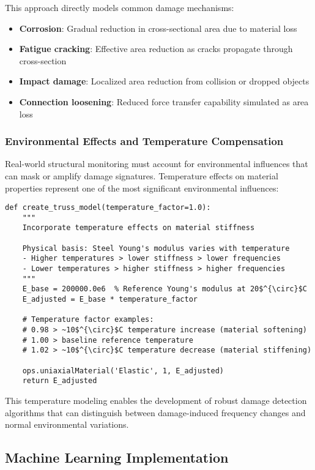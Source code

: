 \documentclass[11pt,a4paper]{article}
\begin{document}
This approach directly models common damage mechanisms:
\begin{itemize}
    \item \textbf{Corrosion}: Gradual reduction in cross-sectional area due to material loss
    \item \textbf{Fatigue cracking}: Effective area reduction as cracks propagate through cross-section
    \item \textbf{Impact damage}: Localized area reduction from collision or dropped objects
    \item \textbf{Connection loosening}: Reduced force transfer capability simulated as area loss
\end{itemize}

\subsubsection{Environmental Effects and Temperature Compensation}

Real-world structural monitoring must account for environmental influences that can mask or amplify damage signatures. Temperature effects on material properties represent one of the most significant environmental influences:

\begin{lstlisting}[caption={Temperature Effect Modeling}]
def create_truss_model(temperature_factor=1.0):
    """
    Incorporate temperature effects on material stiffness
    
    Physical basis: Steel Young's modulus varies with temperature
    - Higher temperatures > lower stiffness > lower frequencies
    - Lower temperatures > higher stiffness > higher frequencies
    """
    E_base = 200000.0e6  % Reference Young's modulus at 20$^{\circ}$C
    E_adjusted = E_base * temperature_factor
    
    # Temperature factor examples:
    # 0.98 > ~10$^{\circ}$C temperature increase (material softening)
    # 1.00 > baseline reference temperature
    # 1.02 > ~10$^{\circ}$C temperature decrease (material stiffening)
    
    ops.uniaxialMaterial('Elastic', 1, E_adjusted)
    return E_adjusted
\end{lstlisting}

This temperature modeling enables the development of robust damage detection algorithms that can distinguish between damage-induced frequency changes and normal environmental variations.

\subsection{Machine Learning Implementation}
\end{document}
